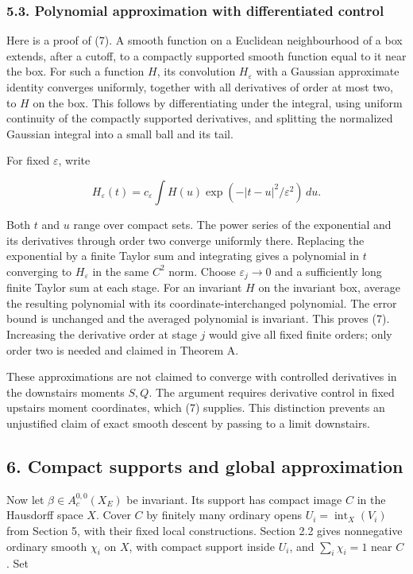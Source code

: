 \documentclass[
  11pt,
]{article}
\begin{document}
\subsubsection{5.3. Polynomial approximation with differentiated
control}\label{polynomial-approximation-with-differentiated-control}

Here is a proof of (7). A smooth function on a Euclidean neighbourhood
of a box extends, after a cutoff, to a compactly supported smooth
function equal to it near the box. For such a function \(H\), its
convolution \(H_\varepsilon\) with a Gaussian approximate identity
converges uniformly, together with all derivatives of order at most two,
to \(H\) on the box. This follows by differentiating under the integral,
using uniform continuity of the compactly supported derivatives, and
splitting the normalized Gaussian integral into a small ball and its
tail.

For fixed \(\varepsilon\), write

\[
H_\varepsilon(t)=c_\varepsilon\int H(u)\exp(-|t-u|^2/\varepsilon^2)\,du.
\]

Both \(t\) and \(u\) range over compact sets. The power series of the
exponential and its derivatives through order two converge uniformly
there. Replacing the exponential by a finite Taylor sum and integrating
gives a polynomial in \(t\) converging to \(H_\varepsilon\) in the same
\(C^2\) norm. Choose \(\varepsilon_j\to0\) and a sufficiently long
finite Taylor sum at each stage. For an invariant \(H\) on the invariant
box, average the resulting polynomial with its coordinate-interchanged
polynomial. The error bound is unchanged and the averaged polynomial is
invariant. This proves (7). Increasing the derivative order at stage
\(j\) would give all fixed finite orders; only order two is needed and
claimed in Theorem A.

These approximations are not claimed to converge with controlled
derivatives in the downstairs moments \(S,Q\). The argument requires
derivative control in fixed upstairs moment coordinates, which (7)
supplies. This distinction prevents an unjustified claim of exact smooth
descent by passing to a limit downstairs.

\subsection{6. Compact supports and global
approximation}\label{compact-supports-and-global-approximation}

Now let \(\beta\in A_c^{0,0}(X_E)\) be invariant. Its support has
compact image \(C\) in the Hausdorff space \(X\). Cover \(C\) by
finitely many ordinary opens \(U_i=\operatorname{int}_X(V_i)\) from
Section 5, with their fixed local constructions. Section 2.2 gives
nonnegative ordinary smooth \(\chi_i\) on \(X\), with compact support
inside \(U_i\), and \(\sum_i\chi_i=1\) near \(C\). Set
\end{document}
